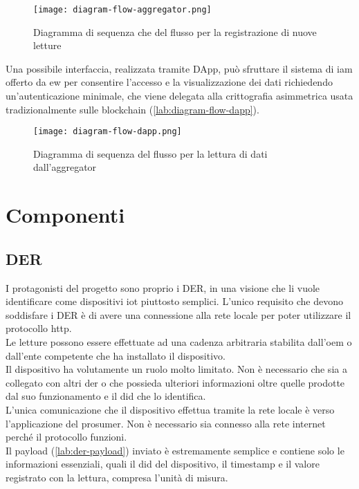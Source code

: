 \begin{figure}[H]
    \texttt{[image: diagram-flow-aggregator.png]}
    \centering
    \caption{Diagramma di sequenza che del flusso per la registrazione di nuove letture}
    \label{lab:diagram-flow-aggregator}
\end{figure}

Una possibile interfaccia, realizzata tramite DApp, può sfruttare il sistema di \gls{iam} offerto da \gls{ew}
per consentire l'accesso e la visualizzazione dei dati richiedendo un'autenticazione minimale,
che viene delegata alla crittografia asimmetrica usata tradizionalmente sulle blockchain (\autoref{lab:diagram-flow-dapp}). \\


\begin{figure}[H]
    \texttt{[image: diagram-flow-dapp.png]}
    \centering
    \caption{Diagramma di sequenza del flusso per la lettura di dati dall'\gls{aggregator}}
    \label{lab:diagram-flow-dapp}
\end{figure}


\section{Componenti}

\subsection{DER}
I protagonisti del progetto sono proprio i DER, in una visione che li vuole identificare come dispositivi \gls{iot} piuttosto semplici.
L'unico requisito che devono soddisfare i DER è di avere una connessione alla rete locale per poter utilizzare il protocollo \gls{http}. \\
Le letture possono essere effettuate ad una cadenza arbitraria stabilita dall'\gls{oem} o dall'ente competente che ha installato il dispositivo. \\
Il dispositivo ha volutamente un ruolo molto limitato. Non è necessario che sia a collegato con altri \gls{der}
o che possieda ulteriori informazioni oltre quelle prodotte dal suo funzionamento e il \gls{did} che lo identifica. \\
L'unica comunicazione che il dispositivo effettua tramite la rete locale è verso l'applicazione del \gls{prosumer}.
Non è necessario sia connesso alla rete internet perché il protocollo funzioni. \\
Il payload (\autoref{lab:der-payload}) inviato è estremamente semplice e contiene solo le informazioni essenziali,
quali il \gls{did} del dispositivo, il timestamp e il valore registrato con la lettura, compresa l'unità di misura. \\

